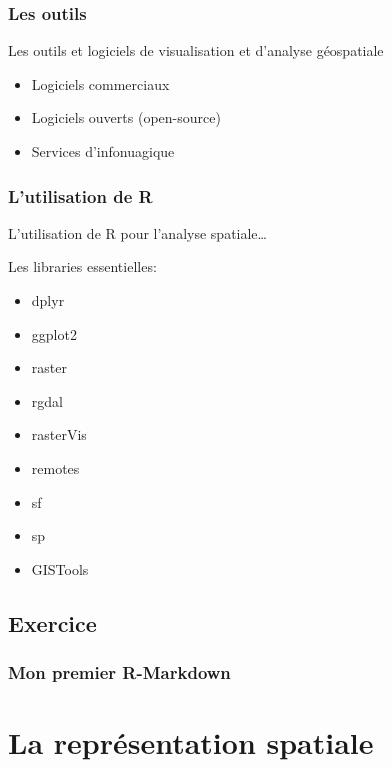\documentclass[
  12pt,
]{krantz}
\providecommand{\tightlist}{%
  \setlength{\itemsep}{0pt}\setlength{\parskip}{0pt}}
\begin{document}
\hypertarget{les-outils}{%
\subsection{Les outils}\label{les-outils}}

Les outils et logiciels de visualisation et d'analyse géospatiale

\begin{itemize}
\tightlist
\item
  Logiciels commerciaux
\item
  Logiciels ouverts (open-source)
\item
  Services d'infonuagique
\end{itemize}

\hypertarget{lutilisation-de-r}{%
\subsection{L'utilisation de R}\label{lutilisation-de-r}}

L'utilisation de R pour l'analyse spatiale\ldots{}

Les libraries essentielles:

\begin{itemize}
\tightlist
\item
  dplyr
\item
  ggplot2
\item
  raster
\item
  rgdal
\item
  rasterVis
\item
  remotes
\item
  sf
\item
  sp
\item
  GISTools
\end{itemize}

\hypertarget{exercice}{%
\section{Exercice}\label{exercice}}

\hypertarget{mon-premier-r-markdown}{%
\subsection{Mon premier R-Markdown}\label{mon-premier-r-markdown}}

\hypertarget{base}{%
\chapter{La représentation spatiale}\label{base}}
\end{document}
